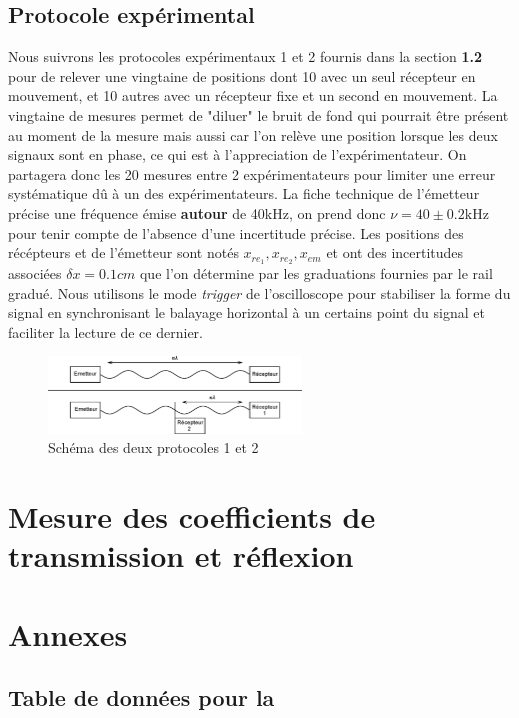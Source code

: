 \documentclass[12pt]{article}
\begin{document}
\subsection{Protocole expérimental}
Nous suivrons les protocoles expérimentaux 1 et 2 fournis dans la section \textbf{1.2} pour de relever une vingtaine de positions dont 10 avec un seul récepteur en mouvement, et 10 autres
avec un récepteur fixe et un second en mouvement. La vingtaine de mesures permet de "diluer" le bruit de fond qui pourrait être présent au moment de la mesure mais aussi car l'on relève une position
lorsque les deux signaux sont en phase, ce qui est à l'appreciation de l'expérimentateur. On partagera donc les 20 mesures entre 2 expérimentateurs pour limiter une erreur systématique dû à un des expérimentateurs. 
La fiche technique de l'émetteur précise une fréquence émise \textbf{autour} de 40kHz, on prend donc $\nu = 40 \pm 0.2 \text{kHz}$ pour tenir compte de l'absence d'une incertitude précise. 
Les positions des récépteurs et de l'émetteur sont notés $x_{re_1}, x_{re_2}, x_{em}$ et ont des incertitudes associées
$\delta x = 0.1cm$ que l'on détermine par les graduations fournies par le rail gradué. 
Nous utilisons le mode \textit{trigger}
de l'oscilloscope pour stabiliser la forme du signal en synchronisant le balayage horizontal à un certains point du signal et faciliter la lecture de ce dernier.
\begin{figure}[!htbp]
	\centering
	\includegraphics[width=0.6\textwidth]{img/schema}
	\hfill
	\caption{Schéma des deux protocoles 1 et 2}
\end{figure}

\break
\section{Mesure des coefficients de transmission et réflexion}


\break
\section*{Annexes}
\subsection*{Table de données pour la }
\end{document}
